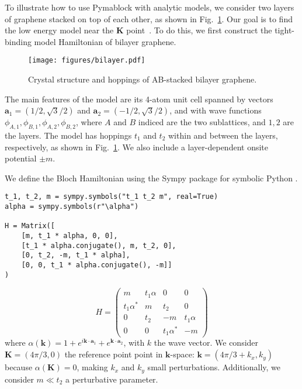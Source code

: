 To illustrate how to use Pymablock with analytic models, we consider two layers
of graphene stacked on top of each other, as shown in Fig.~\ref{fig:bilayer}.
Our goal is to find the low energy model near the $\mathbf{K}$ point~\cite{McCann_2013}.
To do this, we first construct the tight-binding model Hamiltonian of bilayer
graphene.
%
\begin{figure}[!htbp]
\centering
\texttt{[image: figures/bilayer.pdf]}
\caption[]{Crystal structure and hoppings of AB-stacked bilayer graphene.}
\label{fig:bilayer}
\end{figure}
%
The main features of the model are its 4-atom unit cell spanned by vectors
$\mathbf{a}_1 = (1/2, \sqrt{3}/2)$ and $\mathbf{a}_2=( -1/2, \sqrt{3}/2)$,
and with wave functions $\phi_{A,1}, \phi_{B,1}, \phi_{A,2}, \phi_{B,2}$, where
$A$ and $B$ indiced are the two sublattices, and $1,2$ are the layers.
The model has hoppings $t_1$ and $t_2$ within and between the layers,
respectively, as shown in Fig.~\ref{fig:bilayer}.
We also include a layer-dependent onsite potential $\pm m$.

We define the Bloch Hamiltonian using the Sympy package for symbolic Python
\cite{Meurer_2017}.
%
\begin{verbatim}
t_1, t_2, m = sympy.symbols("t_1 t_2 m", real=True)
alpha = sympy.symbols(r"\alpha")

H = Matrix([
    [m, t_1 * alpha, 0, 0],
    [t_1 * alpha.conjugate(), m, t_2, 0],
    [0, t_2, -m, t_1 * alpha],
    [0, 0, t_1 * alpha.conjugate(), -m]]
)
\end{verbatim}

$$
H =
\begin{pmatrix}
m & t_1 \alpha & 0 & 0\\
t_1 \alpha^{*} & m & t_2 & 0\\
0 & t_2 & -m & t_1 \alpha\\
0 & 0 & t_1 \alpha^{*} & -m
\end{pmatrix}
$$
%
where $\alpha(\mathbf{k}) = 1 + e^{i \mathbf{k} \cdot \mathbf{a}_1} + e^{\mathbf{k} \cdot
\mathbf{a}_2}$, with $k$ the wave vector.
We consider $\mathbf{K}=(4\pi/3, 0)$ the reference point point in $\mathbf{k}$-space:
$\mathbf{k} = (4\pi/3 + k_x, k_y)$ because $\alpha(\mathbf{K}) = 0$, making
$k_x$ and $k_y$ small perturbations.
Additionally, we consider $m \ll t_2$ a perturbative parameter.

